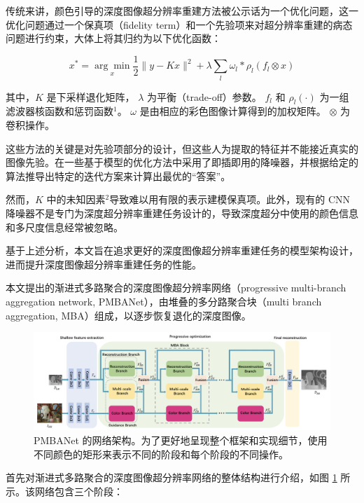 \documentclass[14px]{article}
\begin{document}
传统来讲，颜色引导的深度图像超分辨率重建方法被公示话为一个优化问题，这一优化问题通过一个保真项（fidelity term）和一个先验项来对超分辨率重建的病态问题进行约束，大体上将其归约为以下优化函数：

\begin{equation}
x^{*}=\underset{x}{\arg \min } \frac{1}{2}\|y-K x\|^{2}+\lambda \sum_{l} \omega_{l} * \rho_{l}\left(f_{l} \otimes x\right)
\end{equation}

其中，$K$ 是下采样退化矩阵， $\lambda$ 为平衡（trade-off）参数。 $f_l$ 和 $\rho_l(·)$ 为一组滤波器核函数和惩罚函数$^1$。 $\omega$ 是由相应的彩色图像计算得到的加权矩阵。 $\otimes$ 为卷积操作。

这些方法的关键是对先验项部分的设计，但这些人为提取的特征并不能接近真实的图像先验。在一些基于模型的优化方法中采用了即插即用的降噪器，并根据给定的算法推导出特定的迭代方案来计算出最优的“答案”。

然而，$K$ 中的未知因素$^2$导致难以用有限的表示建模保真项。此外，现有的 CNN 降噪器不是专门为深度超分辨率重建任务设计的，导致深度超分中使用的颜色信息和多尺度信息经常被忽略。

基于上述分析，本文旨在追求更好的深度图像超分辨率重建任务的模型架构设计，进而提升深度图像超分辨率重建任务的性能。

本文提出的渐进式多路聚合的深度图像超分辨率网络（progressive multi-branch aggregation network, PMBANet），由堆叠的多分路聚合块（multi branch aggregation, MBA）组成，以逐步恢复退化的深度图像。

\begin{figure}[!htbp]
\centering
	\includegraphics[width=.7\paperwidth]{img/model.png}
	\caption{PMBANet 的网络架构。为了更好地呈现整个框架和实现细节，使用不同颜色的矩形来表示不同的阶段和每个阶段的不同操作。}
	\label{fig:model}
\end{figure}

首先对渐进式多路聚合的深度图像超分辨率网络的整体结构进行介绍，如图 \ref{fig:model} 所示。该网络包含三个阶段：
\end{document}
